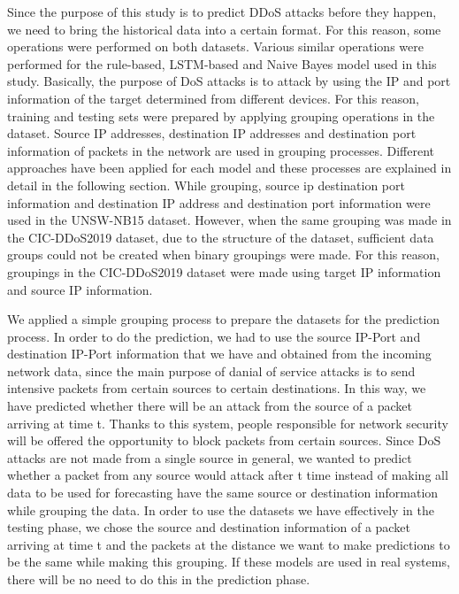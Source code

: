 \documentclass{article}
\begin{document}
Since the purpose of this study is to predict DDoS attacks before they happen, we need to bring the historical data into a certain format. For this reason, some operations were performed on both datasets. Various similar operations were performed for the rule-based, LSTM-based and Naive Bayes model used in this study. Basically, the purpose of DoS attacks is to attack by using the IP and port information of the target determined from different devices. For this reason, training and testing sets were prepared by applying grouping operations in the dataset. Source IP addresses, destination IP addresses and destination port information of packets in the network are used in grouping processes. Different approaches have been applied for each model and these processes are explained in detail in the following section. While grouping, source ip destination port information and destination IP address and destination port information were used in the UNSW-NB15 dataset. However, when the same grouping was made in the CIC-DDoS2019 dataset, due to the structure of the dataset, sufficient data groups could not be created when binary groupings were made. For this reason, groupings in the CIC-DDoS2019 dataset were made using target IP information and source IP information.

We applied a simple grouping process to prepare the datasets for the prediction process. In order to do the prediction, we had to use the source IP-Port and destination IP-Port information that we have and obtained from the incoming network data, since the main purpose of danial of service attacks is to send intensive packets from certain sources to certain destinations. In this way, we have predicted whether there will be an attack from the source of a packet arriving at time t. Thanks to this system, people responsible for network security will be offered the opportunity to block packets from certain sources. Since DoS attacks are not made from a single source in general, we wanted to predict whether a packet from any source would attack after t time instead of making all data to be used for forecasting have the same source or destination information while grouping the data. In order to use the datasets we have effectively in the testing phase, we chose the source and destination information of a packet arriving at time t and the packets at the distance we want to make predictions to be the same while making this grouping. If these models are used in real systems, there will be no need to do this in the prediction phase. 
\end{document}
